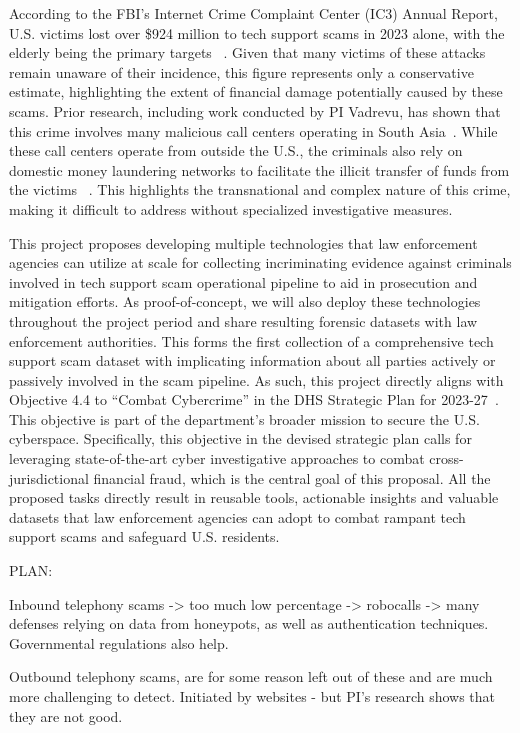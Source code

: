 According to the FBI’s Internet Crime Complaint Center (IC3) Annual Report, U.S. victims lost over \$924 million to tech support scams in 2023 alone, with the elderly being the primary targets ~\cite{}. Given that many victims of these attacks remain unaware of their incidence, this figure represents only a conservative estimate, highlighting the extent of financial damage potentially caused by these scams. Prior research, including work conducted by PI Vadrevu, has shown that this crime involves many malicious call centers operating in South Asia~\cite{}. While these call centers operate from outside the U.S., the criminals also rely on domestic money laundering networks to facilitate the illicit transfer of funds from the victims ~\cite{}. This highlights the transnational and complex nature of this crime, making it difficult to address without specialized investigative measures.

This project proposes developing multiple technologies that law enforcement agencies can utilize at scale for collecting incriminating evidence against criminals involved in tech support scam operational pipeline to aid in prosecution and mitigation efforts. As proof-of-concept, we will also deploy these technologies throughout the project period and share resulting forensic datasets with law enforcement authorities. This forms the first collection of a comprehensive tech support scam dataset with implicating information about all parties actively or passively involved in the scam pipeline. As such, this project directly aligns with Objective 4.4 to “Combat Cybercrime” in the DHS Strategic Plan for 2023-27~\cite{}. This objective is part of the department’s broader mission to secure the U.S. cyberspace. Specifically, this objective in the devised strategic plan calls for leveraging state-of-the-art cyber investigative approaches to combat cross-jurisdictional financial fraud, which is the central goal of this proposal. All the proposed tasks directly result in reusable tools, actionable insights and valuable datasets that law enforcement agencies can adopt to combat rampant tech support scams and safeguard U.S. residents.


PLAN:

Inbound telephony scams -> too much low percentage -> robocalls -> many defenses relying on data from honeypots, as well as authentication techniques. Governmental regulations also help.

Outbound telephony scams, are for some reason left out of these and are much more challenging to detect. Initiated by websites - but PI's research shows that they are not good. 

